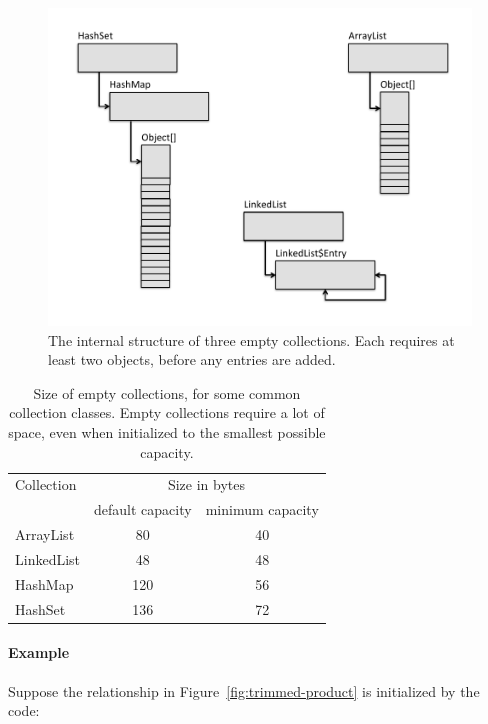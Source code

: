 \begin{figure}
  \centering
 \includegraphics[width=.80\textwidth]{part1/Figures/collections/inside-empty.pdf}
  \caption{The internal structure of three empty collections. Each
  requires at least two objects, before any entries are added.}
  \label{fig:inside-empty}
\end{figure}

\begin{table}
\centering
 		\begin{tabular}{lcc}
 		\toprule
	 	 Collection & \multicolumn{2}{c}{Size in bytes} \\
	 	 & default capacity & minimum capacity \\
	 	 \midrule
	 	ArrayList & 80 & 40 \\
 		LinkedList & 48 & 48 \\
 		HashMap & 120 & 56 \\
 		HashSet & 136 & 72 \\
	 	\bottomrule
	 	\end{tabular}
	\caption{Size of empty collections, for some common
	collection classes.
	Empty collections require a lot of space, even when initialized to the smallest
	possible capacity.}
	\label{tab:empty-collection-costs}
\end{table}

\paragraph{Example} Suppose the relationship
in Figure~\ref{fig:trimmed-product} is initialized by the code:

